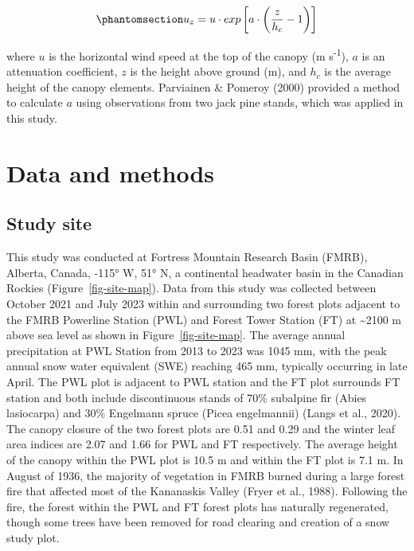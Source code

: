 \documentclass[
  letterpaper,
  DIV=11,
  numbers=noendperiod]{scrartcl}
\begin{document}
\begin{equation}\phantomsection\label{eq-cionco}{
u_z = u\cdot exp\left[a\cdot\left(\frac{z}{h_c}-1\right)\right]
}\end{equation}

where \(u\) is the horizontal wind speed at the top of the canopy (m
s\textsuperscript{-1}), \(a\) is an attenuation coefficient, \(z\) is
the height above ground (m), and \(h_c\) is the average height of the
canopy elements. Parviainen \& Pomeroy (2000) provided a method to
calculate \(a\) using observations from two jack pine stands, which was
applied in this study.

\section{Data and methods}\label{data-and-methods}

\subsection{Study site}\label{study-site}

This study was conducted at Fortress Mountain Research Basin (FMRB),
Alberta, Canada, -115° W, 51° N, a continental headwater basin in the
Canadian Rockies (Figure~\ref{fig-site-map}). Data from this study was
collected between October 2021 and July 2023 within and surrounding two
forest plots adjacent to the FMRB Powerline Station (PWL) and Forest
Tower Station (FT) at \textasciitilde2100 m above sea level as shown in
Figure~\ref{fig-site-map}. The average annual precipitation at PWL
Station from 2013 to 2023 was 1045 mm, with the peak annual snow water
equivalent (SWE) reaching 465 mm, typically occurring in late April. The
PWL plot is adjacent to PWL station and the FT plot surrounds FT station
and both include discontinuous stands of 70\% subalpine fir (Abies
lasiocarpa) and 30\% Engelmann spruce (Picea engelmannii) (Langs et al.,
2020). The canopy closure of the two forest plots are 0.51 and 0.29 and
the winter leaf area indices are 2.07 and 1.66 for PWL and FT
respectively. The average height of the canopy within the PWL plot is
10.5 m and within the FT plot is 7.1 m. In August of 1936, the majority
of vegetation in FMRB burned during a large forest fire that affected
most of the Kananaskis Valley (Fryer et al., 1988). Following the fire,
the forest within the PWL and FT forest plots has naturally regenerated,
though some trees have been removed for road clearing and creation of a
snow study plot.
\end{document}
